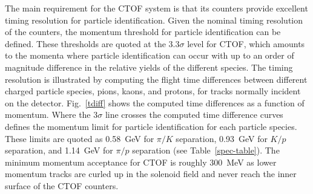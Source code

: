 \documentclass{elsart}
\begin{document}
The main requirement for the CTOF system is that its counters provide excellent timing resolution 
for particle identification. Given the nominal timing resolution of the counters, the momentum 
threshold for particle identification can be defined. These thresholds are quoted at the 3.3$\sigma$
level for CTOF, which amounts to the momenta where particle identification can occur with up to an
order of magnitude difference in the relative yields of the different species. The timing resolution is
illustrated by computing the flight time differences between different charged particle species, pions,
kaons, and protons, for tracks normally incident on the detector. Fig.~\ref{tdiff} shows the computed
time differences as a function of momentum. Where the 3$\sigma$ line crosses the computed time
difference curves defines the momentum limit for particle identification for each particle species.
These limits are quoted as 0.58~GeV for $\pi/K$ separation, 0.93~GeV for $K/p$ separation, and
1.14~GeV for $\pi/p$ separation (see Table~\ref{spec-table}). The minimum momentum acceptance
for CTOF is roughly 300~MeV as lower momentum tracks are curled up in the solenoid field and never
reach the inner surface of the CTOF counters.
\end{document}
